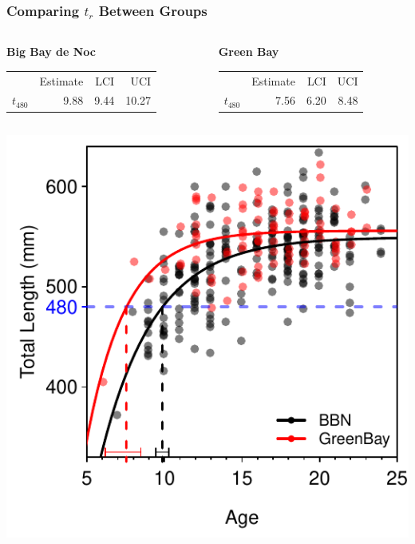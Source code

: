 \documentclass[xcolor=dvipsnames]{beamer}\usepackage[]{graphicx}\usepackage[]{color}
\newenvironment{knitrout}{}{} %
\begin{document}
\begin{frame}[fragile, t]
\frametitle{Comparing $t_{r}$ Between Groups}
\begin{columns}
\begin{column}{0.5\textwidth}
\textbf{Big Bay de Noc}
\begin{table}[ht]
\centering
\begin{tabular}{rrrr}
  \hline
 & Estimate & LCI & UCI \\ 
  \rowcolor{light-gray} \hline
$t_{480}$ & 9.88 & 9.44 & 10.27 \\ 
   \hline
\end{tabular}
\end{table}

\end{column}
\begin{column}{0.5\textwidth}
\textbf{Green Bay}
\begin{table}[ht]
\centering
\begin{tabular}{rrrr}
  \hline
 & Estimate & LCI & UCI \\ 
  \rowcolor{light-gray} \hline
$t_{480}$ & 7.56 & 6.20 & 8.48 \\ 
   \hline
\end{tabular}
\end{table}

\end{column}
\end{columns}

\begin{knitrout}\footnotesize
{}\color{fgcolor}

{\centering \includegraphics[width=.45\linewidth]{Figs/unnamed-chunk-17-1} 

}



\end{knitrout}
\end{frame}
\end{document}
